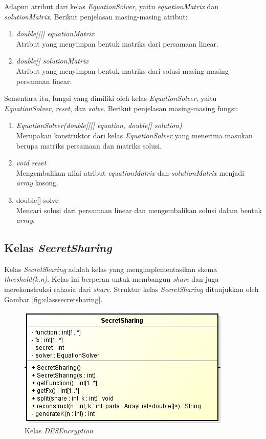 Adapun atribut dari kelas \textit{EquationSolver}, yaitu \textit{equationMatrix} dan \textit{solutionMatrix}. Berikut penjelasan masing-masing atribut:

\begin{enumerate}
	\item \textit{double[][] equationMatrix} \\
	Atribut yang menyimpan bentuk matriks dari persamaan linear.
	\item \textit{double[] solutionMatrix} \\
	Atribut yang menyimpan bentuk matriks dari solusi masing-masing persamaan linear.
\end{enumerate}

Sementara itu, fungsi yang dimiliki oleh kelas \textit{EquationSolver}, yaitu \textit{EquationSolver}, \textit{reset}, dan \textit{solve}. Berikut penjelasan masing-masing fungsi:

\begin{enumerate}
	\item \textit{EquationSolver(double[][] equation, double[] solution)} \\
	Merupakan konstruktor dari kelas \textit{EquationSolver} yang menerima masukan berupa matriks persamaan dan matriks solusi.
	\item \textit{void reset} \\
	Mengembalikan nilai atribut \textit{equationMatrix} dan \textit{solutionMatrix} menjadi \textit{array} kosong.
	\item double[] solve \\
	Mencari solusi dari persamaan linear dan mengembalikan solusi dalam bentuk \textit{array}.
\end{enumerate}

\subsection{Kelas \textit{SecretSharing}}

Kelas \textit{SecretSharing} adalah kelas yang mengimplementasikan skema \textit{threshold(k,n)}. Kelas ini berperan untuk membangun \textit{share} dan juga merekonstruksi rahasia dari \textit{share}. Struktur kelas \textit{SecretSharing} ditunjukkan oleh Gambar \ref{fig:classsecretsharing}.

\begin{figure}[H]
	\centering
	\includegraphics[scale=0.7]{Gambar/class_secret_sharing}
	\caption{Kelas \textit{DESEncryption}}\label{fig:classdesencryption}
\end{figure}

